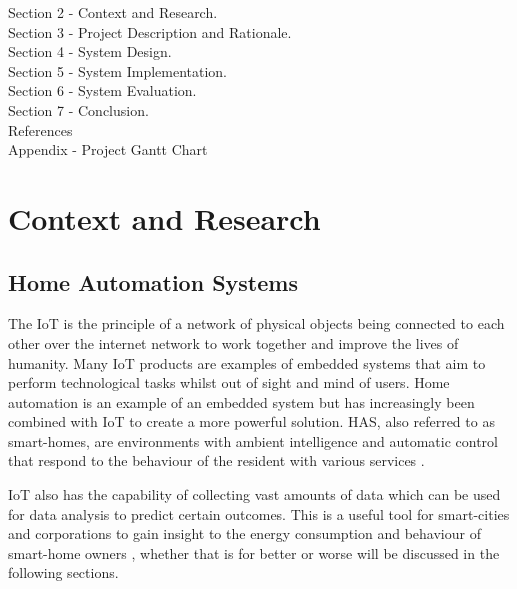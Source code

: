 \documentclass[final]{cmpreport}
\begin{document}

    Section 2 - Context and Research.\\
    Section 3 - Project Description and Rationale.\\
    Section 4 - System Design.\\ 
    Section 5 - System Implementation.\\ 
    Section 6 - System Evaluation.\\ 
    Section 7 - Conclusion.\\ 
    References\\ 
    Appendix - Project Gantt Chart
   

\section{Context and Research}\label{context}


    \subsection{Home Automation Systems}\label{iot}

    The IoT is the principle of a network of physical objects being connected to each other over the internet network to work together and improve the lives of humanity. Many IoT products are examples of embedded systems that aim to perform technological tasks whilst out of sight and mind of users. Home automation is an example of an embedded system but has increasingly been combined with IoT to create a more powerful solution. HAS, also referred to as smart-homes, are environments with ambient intelligence and automatic control that respond to the behaviour of the resident with various services \citep{lossofauto}.
    

    IoT also has the capability of collecting vast amounts of data which can be used for data analysis to predict certain outcomes. This is a useful tool for smart-cities and corporations to gain insight to the energy consumption and behaviour of smart-home owners \citep{IoTBigData}, whether that is for better or worse will be discussed in the following sections.
\end{document}
